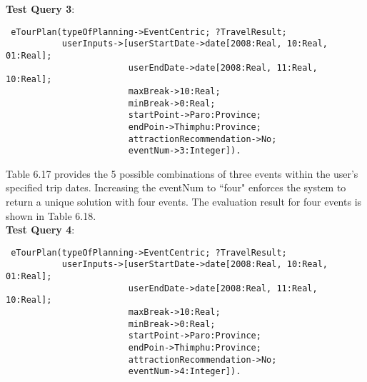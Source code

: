 \pagebreak

\hspace{0.3in}\textbf{Test Query 3}:
\begin{small}
\singlespacing
\begin{verbatim}
 eTourPlan(typeOfPlanning->EventCentric; ?TravelResult;
           userInputs->[userStartDate->date[2008:Real, 10:Real, 01:Real];  
                        userEndDate->date[2008:Real, 11:Real, 10:Real]; 
                        maxBreak->10:Real;  
                        minBreak->0:Real; 
                        startPoint->Paro:Province;  
                        endPoin->Thimphu:Province;
                        attractionRecommendation->No; 
                        eventNum->3:Integer]).
\end{verbatim} 
\end{small}

 
\hspace{0.3in}Table 6.17 provides the 5 possible combinations of three events within the user's specified trip dates. Increasing the eventNum to ``four" enforces the system to return a unique solution with four events. The evaluation result for four events is shown in Table 6.18.\\

\hspace{0.3in}\textbf{Test Query 4}:
\begin{small}
\singlespacing
\begin{verbatim}
 eTourPlan(typeOfPlanning->EventCentric; ?TravelResult;
           userInputs->[userStartDate->date[2008:Real, 10:Real, 01:Real];  
                        userEndDate->date[2008:Real, 11:Real, 10:Real]; 
                        maxBreak->10:Real;  
                        minBreak->0:Real; 
                        startPoint->Paro:Province;  
                        endPoin->Thimphu:Province;
                        attractionRecommendation->No; 
                        eventNum->4:Integer]).
\end{verbatim} 
\end{small}

